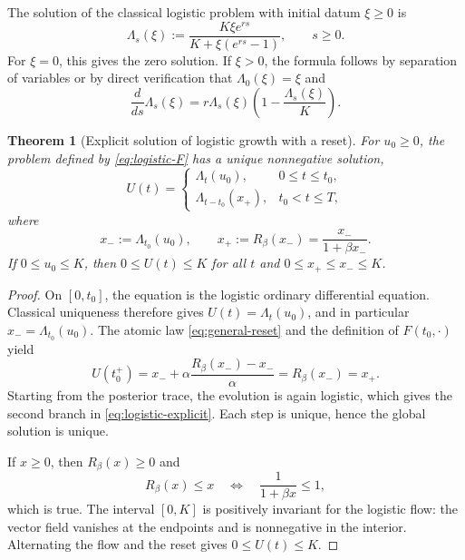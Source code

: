 \documentclass[preprint,12pt]{elsarticle}
\newtheorem{theorem}{Theorem}[section]
\theoremstyle{definition}
\theoremstyle{remark}
\begin{document}
The solution of the classical logistic problem with initial datum $\xi\ge0$ is
\begin{equation}\label{eq:logistic-flow}
 \Lambda_s(\xi)
 :=\frac{K\xi e^{rs}}{K+\xi(e^{rs}-1)},\qquad s\ge0.
\end{equation}
For $\xi=0$, this gives the zero solution. If $\xi>0$, the formula follows by separation of variables or by direct verification that $\Lambda_0(\xi)=\xi$ and
\[
 \frac{d}{ds}\Lambda_s(\xi)
 =r\Lambda_s(\xi)\left(1-\frac{\Lambda_s(\xi)}K\right).
\]

\begin{theorem}[Explicit solution of logistic growth with a reset]\label{thm:logistic-explicit}
For $u_0\ge0$, the problem defined by \eqref{eq:logistic-F} has a unique nonnegative solution,
\begin{equation}\label{eq:logistic-explicit}
 U(t)=
 \begin{cases}
 \Lambda_t(u_0),&0\le t\le t_0,\\[1mm]
 \Lambda_{t-t_0}(x_+),&t_0<t\le T,
 \end{cases}
\end{equation}
where
\begin{equation}\label{eq:logistic-reset-values}
 x_-:=\Lambda_{t_0}(u_0),
 \qquad
 x_+:=R_\beta(x_-)=\frac{x_-}{1+\beta x_-}.
\end{equation}
If $0\le u_0\le K$, then $0\le U(t)\le K$ for all $t$ and $0\le x_+\le x_-\le K$.
\end{theorem}

\begin{proof}
On $[0,t_0]$, the equation is the logistic ordinary differential equation. Classical uniqueness therefore gives $U(t)=\Lambda_t(u_0)$, and in particular $x_-=\Lambda_{t_0}(u_0)$. The atomic law \eqref{eq:general-reset} and the definition of $F(t_0,\cdot)$ yield
\[
 U(t_0^+)=x_-+\alpha\frac{R_\beta(x_-)-x_-}{\alpha}=R_\beta(x_-)=x_+.
\]
Starting from the posterior trace, the evolution is again logistic, which gives the second branch in \eqref{eq:logistic-explicit}. Each step is unique, hence the global solution is unique.

If $x\ge0$, then $R_\beta(x)\ge0$ and
\[
 R_\beta(x)\le x
 \quad\Longleftrightarrow\quad
 \frac1{1+\beta x}\le1,
\]
which is true. The interval $[0,K]$ is positively invariant for the logistic flow: the vector field vanishes at the endpoints and is nonnegative in the interior. Alternating the flow and the reset gives $0\le U(t)\le K$.
\end{proof}
\end{document}
